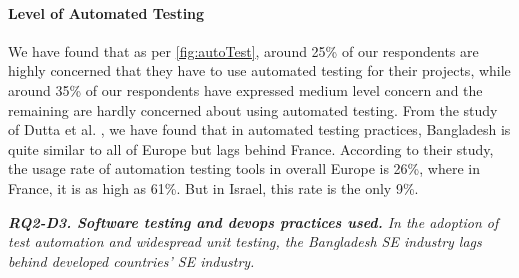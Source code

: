 \paragraph{Level of Automated Testing}
We have found that as per \ref{fig:autoTest}, around 25\% of our respondents are highly concerned that they have to use automated testing for their projects, while around 35\% of our respondents have expressed medium level concern and the remaining are hardly concerned about using automated testing. From the study of Dutta et al. \citep{dutta1999}, we have found that in automated testing practices, Bangladesh is quite similar to all of Europe but lags behind France. According to their study, the usage rate of automation testing tools in overall Europe is 26\%, where in France, it is as high as 61\%. But in Israel, this rate is the only 9\%.

\begin{tcolorbox}[flushleft upper,boxrule=1pt,arc=0pt,left=0pt,right=0pt,top=0pt,bottom=0pt,colback=white,after=\ignorespacesafterend\par\noindent]
\nd\it{\bf{RQ2-D3. Software testing and devops practices used.}} 
In the adoption of test automation and widespread unit testing, the Bangladesh SE industry lags behind developed countries'  SE industry. 
\end{tcolorbox}
